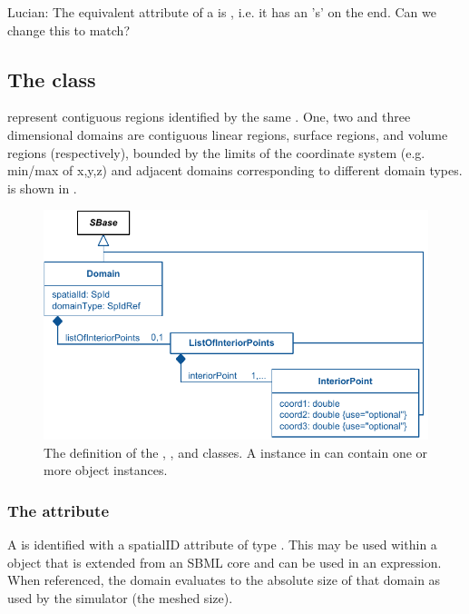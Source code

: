 {\color{red} Lucian: \notice The equivalent attribute of a \Compartment is , i.e. it has an 's' on the end.  Can we change this to match?}


\subsection{The  class}
\label{Domain-class}
\label{ListOfInteriorPoints-class}
\Domains represent contiguous regions identified by the same \DomainType.  One, two and three dimensional domains are contiguous linear regions, surface regions, and volume regions (respectively), bounded by the limits of the coordinate system (e.g. min/max of x,y,z) and adjacent domains corresponding to different domain types.  \Domain is shown in .
 
\begin{figure}[ht]
  \includegraphics{figs/Domain-uml}
  \caption{The definition of the \Domain, \ListOfInteriorPoints, and \InteriorPoint classes.  A \ListOfDomains instance in \Geometry can contain one or more \Domain object instances.}
  \label{Domain-uml}
  \label{InteriorPoint-uml}
  \label{ListOfInteriorPoints-uml}
\end{figure}

\subsubsection{The  attribute}
A \Domain is identified with a spatialID attribute of type .  This  may be used within a \SpatialSymbolReference object that is extended from an SBML core \Parameter and can be used in an expression.  When referenced, the domain evaluates to the absolute size of that domain as used by the simulator (the meshed size).

